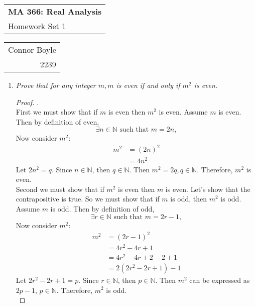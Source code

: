 \documentclass{amsart}
\def\name{Connor Boyle} %
\def\CM{2239} %
\def\hwnum{1} %
\begin{document}
\noindent
\thispagestyle{firststyle}
\begin{tabular}{l}
{\LARGE \textbf{MA 366: Real Analysis} }\\
{\Large Homework Set \hwnum}
\end{tabular} \hfill \begin{tabular}{r}
                        \name \\
                        \CM
                        \end{tabular}

\noindent \hrulefill

\begin{enumerate}[1.]
\item \emph{Prove that for any integer $m, m$ is even if and only if $m^2$ is even.}
\begin{proof} .\\

First we must show that if $m$ is even then $m^2$ is even.
Assume $m$ is even. Then by definition of even, 
\[\exists n\in\mathbb{N} \text{ such that } m = 2n, \]
Now consider $m^2$:
\begin{align*} 
    m^2 &= (2n)^2 \\
    &= 4n^2
\end{align*}
Let $2n^2 = q$. Since $n\in\mathbb{N}$, then $q\in\mathbb{N}$. 
Then $m^2 = 2q, q\in\mathbb{N}$. Therefore, $m^2$ is even. \\

Second we must show that if $m^2$ is even then $m$ is even.
Let's show that the contrapositive is true.
So we must show that if $m$ is odd, then $m^2$ is odd.
Assume $m$ is odd. Then by definition of odd, 
\[\exists r\in\mathbb{N} \text{ such that } m = 2r - 1, \]
Now consider $m^2$:
\begin{align*}
    m^2 &= (2r - 1)^2 \\
    &= 4r^2 - 4r + 1 \\
    &= 4r^2 - 4r + 2 - 2 + 1 \\
    &= 2(2r^2 -2r + 1) - 1
\end{align*}
Let $2r^2 - 2r + 1 = p$. Since $r\in\mathbb{N}$, then $p\in\mathbb{N}$.
Then $m^2$ can be expressed as $2p - 1$, $p\in\mathbb{N}$. Therefore, $m^2$ is odd. \\
\end{proof}


\end{enumerate}
\end{document}
